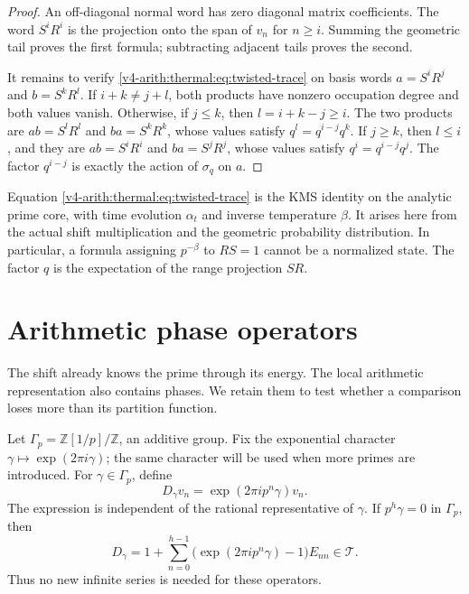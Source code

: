 \begin{proof}
An off-diagonal normal word has zero diagonal matrix coefficients.
The word $S^iR^i$ is the projection onto the span of $v_n$ for
$n\geq i$. Summing the geometric tail proves the first formula;
subtracting adjacent tails proves the second.

It remains to verify \eqref{v4-arith:thermal:eq:twisted-trace} on basis words
$a=S^iR^j$ and $b=S^kR^l$. If $i+k\ne j+l$, both products have
nonzero occupation degree and both values vanish. Otherwise, if
$j\leq k$, then $l=i+k-j\geq i$. The two products are
$ab=S^lR^l$ and $ba=S^kR^k$, whose values satisfy
$q^l=q^{i-j}q^k$. If $j\geq k$, then $l\leq i$, and they are
$ab=S^iR^i$ and $ba=S^jR^j$, whose values satisfy
$q^i=q^{i-j}q^j$. The factor $q^{i-j}$ is exactly the action of
$\sigma_q$ on $a$.
\end{proof}

Equation \eqref{v4-arith:thermal:eq:twisted-trace} is the KMS identity on the analytic
prime core, with time evolution $\alpha_t$ and inverse temperature
$\beta$. It arises here from the actual shift multiplication and
the geometric probability distribution. In particular, a formula
assigning $p^{-\beta}$ to $RS=1$ cannot be a normalized state.
The factor $q$ is the expectation of the range projection $SR$.

\section{Arithmetic phase operators}

The shift already knows the prime through its energy. The local
arithmetic representation also contains phases. We retain them to
test whether a comparison loses more than its partition function.

Let $\Gamma_p=\mathbb Z[1/p]/\mathbb Z$, an additive group. Fix
the exponential character $\gamma\mapsto\exp(2\pi i\gamma)$;
the same character will be used when more primes are introduced. For
$\gamma\in\Gamma_p$, define
\[
 D_\gamma v_n=\exp(2\pi i p^n\gamma)v_n.
\]
The expression is independent of the rational representative of
$\gamma$. If $p^h\gamma=0$ in $\Gamma_p$, then
\begin{equation}
 D_\gamma=1+\sum_{n=0}^{h-1}
       \bigl(\exp(2\pi i p^n\gamma)-1\bigr)E_{nn}\in\mathcal T.
 \label{v4-arith:thermal:eq:phase-finite}
\end{equation}
Thus no new infinite series is needed for these operators.

